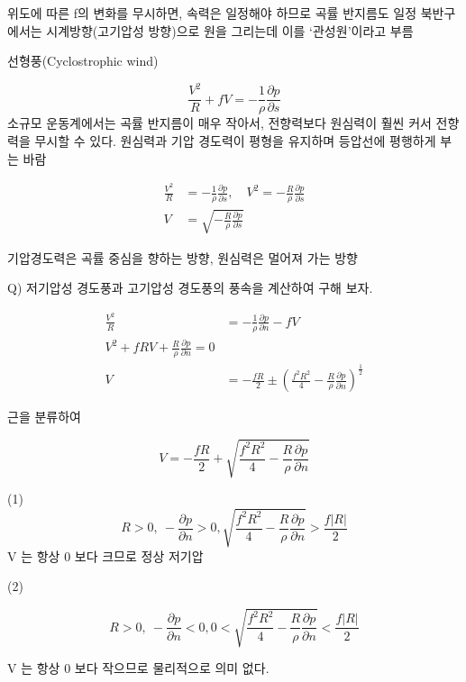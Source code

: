 위도에 따른 f의 변화를 무시하면, 속력은 일정해야 하므로
곡률 반지름도 일정
북반구에서는 시계방향(고기압성 방향)으로 원을 그리는데
이를 ‘관성원’이라고 부름

        

선형풍(Cyclostrophic wind)

$${\displaystyle	{
	\frac{V^{2}}{R}+f  V = -\frac{1}{\rho}\frac{\partial p}{\partial s} 
}	}$$
소규모 운동계에서는 곡률 반지름이 매우 작아서, 전향력보다 원심력이
훨씬 커서 전향력을 무시할 수 있다. 
원심력과 기압 경도력이 평형을 유지하며 등압선에 평행하게 부는 바람

$${\displaystyle	{
	\begin{aligned}
		\frac{V^{2}}{R} &= -\frac{1}{\rho}\frac{\partial p}{\partial s}, \quad
		V^{2} = -\frac{{R}}{\rho}\frac{\partial p}{\partial s} \\
	V &= \sqrt {-\frac{{R}}{\rho}\frac{\partial p}{\partial s}}
	\end{aligned}
}	}$$


기압경도력은 곡률 중심을 향하는 방향, 원심력은 멀어져 가는 방향

 




Q) 저기압성 경도풍과 고기압성 경도풍의 풍속을 계산하여 구해 보자.

$${\displaystyle	{
	\begin{aligned}
	\frac{V^2}{R} &=-\frac{1}{\rho} \frac{\partial p}{\partial	n}-f V\\		
	V^{2}+f R V+\frac{R}{\rho} \frac{\partial p}{\partial n}=0 \\ 
	V&=-\frac{f R}{2} \pm\left(\frac{f^{2} R^{2}}{4}-\frac{R}{\rho} \frac{\partial p}{\partial n}\right)^{\frac{1}{2}}
	\end{aligned}
}}$$

근을 분류하여

$${\displaystyle	{
		V=-\frac{f R}{2} +\sqrt {\frac{f^{2} R^{2}}{4}-\frac{R}{\rho} \frac{\partial p}{\partial n}}		
}	}$$


(1)
$${\displaystyle	{
	R>0, ~- \frac{\partial p}{\partial n} > 0 ,  
	\sqrt {\frac{f^{2} R^{2}}{4}-\frac{R}{\rho} \frac{\partial p}{\partial n}} > \frac{f|R|}{2}
}	}$$
V 는 항상 0 보다 크므로 정상 저기압

        
(2)

$${\displaystyle	{
	R>0, ~- \frac{\partial p}{\partial n} < 0 ,  
	0 < \sqrt {\frac{f^{2} R^{2}}{4}-\frac{R}{\rho} \frac{\partial p}{\partial n}} < \frac{f|R|}{2}
}	}$$

V 는 항상 0 보다 작으므로 물리적으로 의미 없다.



